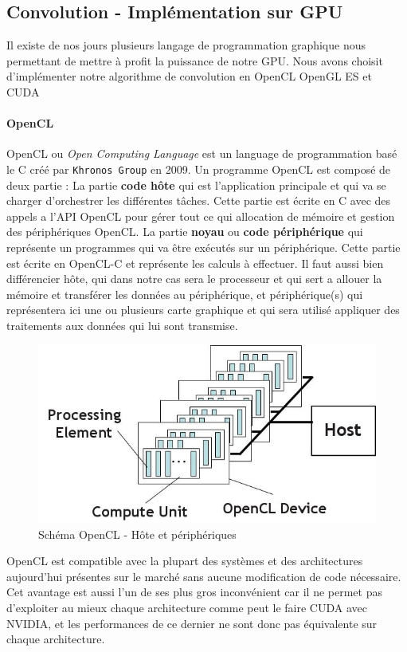 \subsection{Convolution - Implémentation sur GPU}
Il existe de nos jours plusieurs langage de programmation graphique nous permettant de mettre à profit la puissance de notre GPU. Nous avons choisit d'implémenter notre algorithme de convolution en OpenCL %
OpenGL ES%
et CUDA %

\paragraph{OpenCL} OpenCL ou \emph{Open Computing Language} est un language de programmation basé le C créé par \texttt{Khronos Group} en 2009.
Un programme OpenCL est composé de deux partie :
La partie \textbf{code hôte} qui est l'application principale et qui va se charger d'orchestrer les différentes tâches. Cette partie est écrite en C avec des appels a l'API OpenCL pour gérer tout ce qui allocation de mémoire et gestion des périphériques OpenCL.
La partie \textbf{noyau} ou \textbf{code périphérique} qui représente un programmes qui va être exécutés sur un périphérique. Cette partie est écrite en OpenCL-C et représente les calculs à effectuer.
Il faut aussi bien différencier hôte, qui dans notre cas sera le processeur et qui sert a allouer la mémoire et transférer les données au périphérique, et périphérique(s) qui représentera ici une ou plusieurs carte graphique et qui sera utilisé appliquer des traitements aux données qui lui sont transmise.
\begin{figure}[H]
\centering
\includegraphics[width=0.5\linewidth]{images/opencl}
\caption{Schéma OpenCL - Hôte et périphériques\protect\footnotemark}
\label{fig:opencl}
\end{figure}


OpenCL est compatible avec la plupart des systèmes et des architectures aujourd'hui présentes sur le marché sans aucune modification de code nécessaire. Cet avantage est aussi l'un de ses plus gros inconvénient car il ne permet pas d'exploiter au mieux chaque architecture comme peut le faire CUDA avec NVIDIA, et les performances de ce dernier ne sont donc pas équivalente sur chaque architecture.

